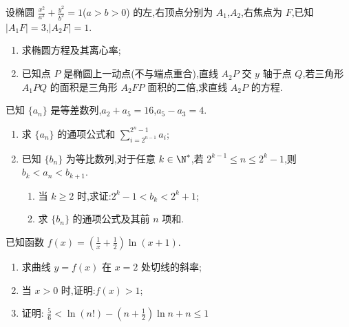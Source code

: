 \begin{problem}
设椭圆 \(\frac{x^2}{a^2}+\frac{y^2}{b^2}=1\)(\(a>b>0\)) 的左,右顶点分别为 \(A_1\),\(A_2\),右焦点为 \(F\),已知 \(|A_1F|=3\),\(|A_2F|=1\).

\begin{enumerate}
\item 求椭圆方程及其离心率;
\item 已知点 \(P\) 是椭圆上一动点(不与端点重合),直线 \(A_2P\) 交 \(y\) 轴于点 \(Q\),若三角形 \(A_1PQ\) 的面积是三角形 \(A_2FP\) 面积的二倍,求直线 \(A_2P\) 的方程.
\end{enumerate}
\end{problem}

\begin{problem}
已知 \(\{a_n\}\) 是等差数列,\(a_2+a_5=16\),\(a_5-a_3=4\).

\begin{enumerate}
\item 求 \(\{a_n\}\) 的通项公式和 \(\displaystyle\sum_{i=2^{n-1}}^{2^n-1}a_i\);
\item 已知 \(\{b_n\}\) 为等比数列,对于任意 \(k\in \N^*\),若 \(2^{k-1}\le n\le 2^k-1\),则 \(b_k<a_n<b_{k+1}\).

    \begin{enumerate}
    \item 当 \(k\ge 2\) 时,求证:\(2^k-1<b_k<2^k+1\);
    \item 求 \(\{b_n\}\) 的通项公式及其前 \(n\) 项和.
    \end{enumerate}
\end{enumerate}
\end{problem}

\begin{problem}
已知函数 \(f(x)=\left( \frac{1}{x}+\frac{1}{2} \right)\ln(x+1)\).

\begin{enumerate}
\item 求曲线 \(y=f(x)\) 在 \(x=2\) 处切线的斜率;
\item 当 \(x>0\) 时,证明:\(f(x)>1\);
\item 证明:
\(\frac{5}{6}<\ln(n!)-\left( n+\frac{1}{2} \right)\ln n+n\le 1\)
\end{enumerate}
\end{problem}

